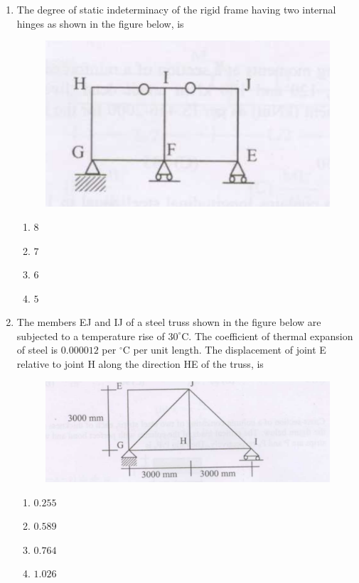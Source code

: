 \documentclass[journal]{IEEEtran}
\begin{document}
\begin{enumerate}
\item The degree of static indeterminacy of the rigid frame having two internal hinges as shown in the figure below, is \textbf{}


\begin{figure}[h]
    \centering
    \includegraphics[width=0.8\columnwidth]{figs/fig6.png}
\end{figure}

\begin{multicols}{2}
\begin{enumerate}
\item $8$
\item $7$
\item $6$
\item $5$
\end{enumerate}
\end{multicols}

\vspace{2cm}

\item The members EJ and IJ of a steel truss shown in the figure below are subjected to a temperature rise of $30^\circ\text{C}$. The coefficient of thermal expansion of steel is $0.000012$ per $^\circ\text{C}$ per unit length. The displacement  of joint E relative to joint H along the direction HE of the truss, is \textbf{}
\begin{figure}[h]
    \centering
    \includegraphics[width=0.8\columnwidth]{figs/fig7.png}
\end{figure}
\begin{multicols}{2}
\begin{enumerate}
\item $0.255$
\item $0.589$
\item $0.764$
\item $1.026$
\end{enumerate}
\end{multicols}


\end{enumerate}
\end{document}
